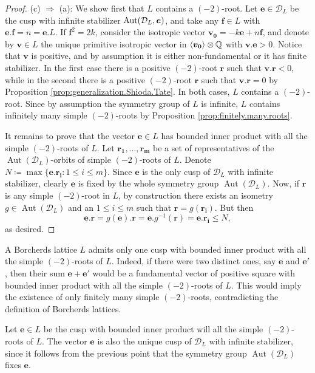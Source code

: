\documentclass[11pt,letterpaper]{amsart}
\newcommand{\vect}[1]{\boldsymbol{#1}}
\DeclareMathOperator{\Aut}{Aut}
\begin{document}
\begin{proof}
    (c) $\Rightarrow$ (a): We show first that $L$ contains a $(-2)$-root. Let $\vect{e}\in \mathcal{D}_L$ be the cusp with infinite stabilizer $\Stabe$, and take any $\vect{f}\in L$ with $\vect{e}.\vect{f}=n=\vect{e}.L$. If $\vect{f}^2=2k$, consider the isotropic vector $\vect{v_0}=-k\vect{e}+n\vect{f}$, and denote by $\vect{v}\in L$ the unique primitive isotropic vector in $\langle \vect{v_0} \rangle \otimes \QQ$ with $\vect{v}.\vect{e}>0$. Notice that $\vect{v}$ is positive, and by assumption it is either non-fundamental or it has finite stabilizer. In the first case there is a positive $(-2)$-root $\vect{r}$ such that $\vect{v}.\vect{r}<0$, while in the second there is a positive $(-2)$-root $\vect{r}$ such that $\vect{v}.\vect{r}=0$ by Proposition \ref{prop:generalization.Shioda.Tate}. In both cases, $L$ contains a $(-2)$-root. Since by assumption the symmetry group of $L$ is infinite, $L$ contains infinitely many simple $(-2)$-roots by Proposition \ref{prop:finitely.many.roots}.
        
    It remains to prove that the vector $\vect{e}\in L$ has bounded inner product with all the simple $(-2)$-roots of $L$. 
    Let $\vect{r_1},\ldots,\vect{r_m}$ be a set of representatives of the $\Aut(\mathcal{D}_L)$-orbits of simple $(-2)$-roots of $L$. Denote $N\coloneqq \max\{\vect{e}.\vect{r_i} : 1\le i \le m\}$.
    Since $\vect{e}$ is the only cusp of $\mathcal{D}_L$ with infinite stabilizer, clearly $\vect{e}$ is fixed by the whole symmetry group $\Aut(\mathcal{D}_L)$. Now, if $\vect{r}$ is any simple $(-2)$-root in $L$, by construction there exists an isometry $g\in \Aut(\mathcal{D}_L)$ and an $1\le i \le m$ such that $\vect{r}=g(\vect{r_i})$. But then
    $$\vect{e}.\vect{r}=g(\vect{e}).\vect{r}=\vect{e}.g^{-1}(\vect{r})=\vect{e}.\vect{r_i} \le N,$$
    as desired.
\end{proof}

\begin{remark}   
 A Borcherds lattice $L$ admits only one cusp with bounded inner product with all the simple $(-2)$-roots of $L$. Indeed, if there were two distinct ones, say $\vect{e}$ and $\vect{e'}$, then their sum $\vect{e}+\vect{e'}$ would be a fundamental vector of positive square with bounded inner product with all the simple $(-2)$-roots of $L$. This would imply the existence of only finitely many simple $(-2)$-roots, contradicting the definition of Borcherds lattices.

 Let $\vect{e}\in L$ be the cusp with bounded inner product will all the simple $(-2)$-roots of $L$. The vector $\vect{e}$ is also the unique cusp of $\mathcal{D}_L$ with infinite stabilizer, since it follows from the previous point that the symmetry group $\Aut(\mathcal{D}_L)$ fixes $\vect{e}$.
\end{remark}
    
\end{document}
